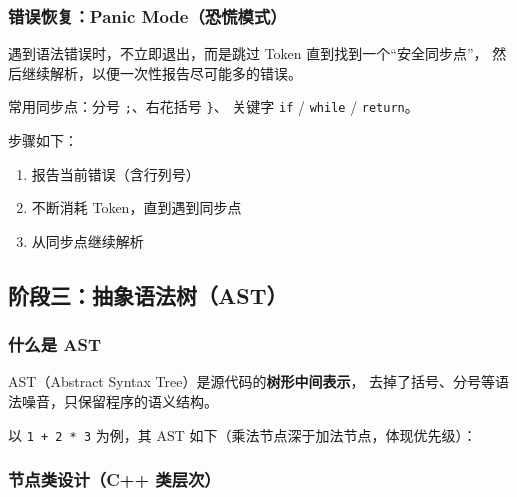 \documentclass[12pt, a4paper]{ctexart}
\begin{document}
\subsubsection{错误恢复：Panic Mode（恐慌模式）}

遇到语法错误时，不立即退出，而是跳过 Token 直到找到一个``安全同步点''，
然后继续解析，以便一次性报告尽可能多的错误。

常用同步点：分号 \texttt{;}、右花括号 \texttt{\}}、
关键字 \texttt{if} / \texttt{while} / \texttt{return}。

步骤如下：
\begin{enumerate}
  \item 报告当前错误（含行列号）
  \item 不断消耗 Token，直到遇到同步点
  \item 从同步点继续解析
\end{enumerate}

\subsection{阶段三：抽象语法树（AST）}

\subsubsection{什么是 AST}

AST（Abstract Syntax Tree）是源代码的\textbf{树形中间表示}，
去掉了括号、分号等语法噪音，只保留程序的语义结构。

以 \texttt{1 + 2 * 3} 为例，其 AST 如下（乘法节点深于加法节点，体现优先级）：

\begin{center}
\end{center}

\subsubsection{节点类设计（C++ 类层次）}
\end{document}
